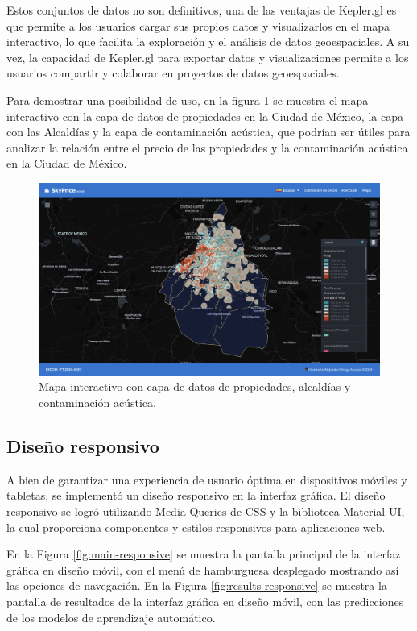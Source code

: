 Estos conjuntos de datos no son definitivos, una de las ventajas de Kepler.gl es
que permite a los usuarios cargar sus propios datos y visualizarlos en el mapa
interactivo, lo que facilita la exploración y el análisis de datos geoespaciales.
A su vez, la capacidad de Kepler.gl para exportar datos y visualizaciones permite
a los usuarios compartir y colaborar en proyectos de datos geoespaciales.

Para demostrar una posibilidad de uso, en la figura \ref{fig:mapa-interactivo-ejemplo}
se muestra el mapa interactivo con  la capa de datos de propiedades en la Ciudad
de México, la capa con las Alcaldías y la capa de contaminación acústica, que podrían
ser útiles para analizar la relación entre el precio de las propiedades y la contaminación
acústica en la Ciudad de México.

\begin{figure}[H]
    \centering
    \includegraphics[width=1.0\textwidth]{imagenes/05-implementacion/interfaz-grafica/mapa-interactivo-ejemplo.png}
    \caption{Mapa interactivo con capa de datos de propiedades, alcaldías y contaminación acústica.}
    \label{fig:mapa-interactivo-ejemplo}
\end{figure}

\subsection{Diseño responsivo}
A bien de garantizar una experiencia de usuario óptima en dispositivos móviles y
tabletas, se implementó un diseño responsivo en la interfaz gráfica. El diseño
responsivo se logró utilizando Media Queries de CSS y la biblioteca Material-UI,
la cual proporciona componentes y estilos responsivos para aplicaciones web.

En la Figura \ref{fig:main-responsive} se muestra la pantalla principal de la
interfaz gráfica en diseño móvil, con el menú de hamburguesa desplegado mostrando
así las opciones de navegación. En la Figura \ref{fig:results-responsive} se
muestra la pantalla de resultados de la interfaz gráfica en diseño móvil, con
las predicciones de los modelos de aprendizaje automático.

